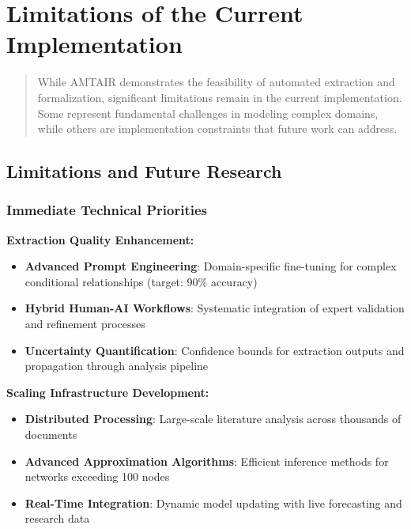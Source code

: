 \documentclass[
  11pt,
  letterpaper,
]{book}
\providecommand{\tightlist}{%
  \setlength{\itemsep}{0pt}\setlength{\parskip}{0pt}}
\begin{document}
\section{Limitations of the Current
Implementation}\label{sec-limitations1}

\begin{quote}
While AMTAIR demonstrates the feasibility of automated extraction and
formalization, significant limitations remain in the current
implementation. Some represent fundamental challenges in modeling
complex domains, while others are implementation constraints that future
work can address.
\end{quote}

\subsection{Limitations and Future Research}\label{sec-future-research2}

\subsubsection{Immediate Technical
Priorities}\label{sec-technical-priorities}

\textbf{Extraction Quality Enhancement:}

\begin{itemize}
\tightlist
\item
  \textbf{Advanced Prompt Engineering}: Domain-specific fine-tuning for
  complex conditional relationships (target: 90\% accuracy)
\item
  \textbf{Hybrid Human-AI Workflows}: Systematic integration of expert
  validation and refinement processes
\item
  \textbf{Uncertainty Quantification}: Confidence bounds for extraction
  outputs and propagation through analysis pipeline
\end{itemize}

\textbf{Scaling Infrastructure Development:}

\begin{itemize}
\tightlist
\item
  \textbf{Distributed Processing}: Large-scale literature analysis
  across thousands of documents
\item
  \textbf{Advanced Approximation Algorithms}: Efficient inference
  methods for networks exceeding 100 nodes
\item
  \textbf{Real-Time Integration}: Dynamic model updating with live
  forecasting and research data
\end{itemize}
\end{document}
